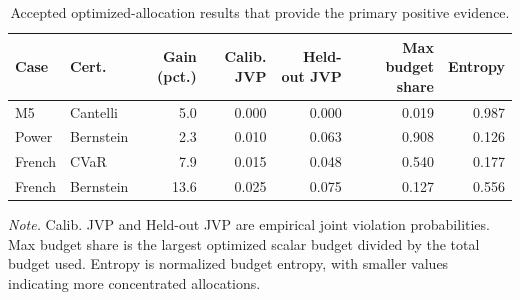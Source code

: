 \begin{table}[t]
\centering
\small
\caption{Accepted optimized-allocation results that provide the primary positive evidence.}
\label{tab:positive_results}
\begin{tabularx}{\linewidth}{llrrrrr}
\toprule
Case & Cert. & Gain (pct.) & Calib. JVP & Held-out JVP & Max budget share & Entropy \\
\midrule
M5 & Cantelli & 5.0 & 0.000 & 0.000 & 0.019 & 0.987 \\
Power & Bernstein & 2.3 & 0.010 & 0.063 & 0.908 & 0.126 \\
French & CVaR & 7.9 & 0.015 & 0.048 & 0.540 & 0.177 \\
French & Bernstein & 13.6 & 0.025 & 0.075 & 0.127 & 0.556 \\
\bottomrule
\end{tabularx}
\vspace{2pt}
\begin{minipage}{.98\linewidth}
\footnotesize \textit{Note.} Calib. JVP and Held-out JVP are empirical joint violation probabilities. Max budget share is the largest optimized scalar budget divided by the total budget used. Entropy is normalized budget entropy, with smaller values indicating more concentrated allocations.
\end{minipage}
\end{table}

